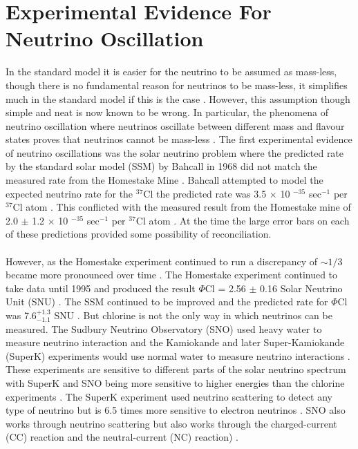 \section{Experimental Evidence For Neutrino Oscillation}\label{sec:neutrinoFlavours}
In the standard model it is easier for the neutrino to be assumed as mass-less, though there is no fundamental reason for neutrinos to be mass-less, it simplifies much in the standard model if this is the case \cite{griffiths2008neutrinoOscillations}. However, this assumption though simple and neat is now known to be wrong. In particular, the phenomena of neutrino oscillation where neutrinos oscillate between different mass and flavour states proves that neutrinos cannot be mass-less \cite{griffiths2008neutrinoOscillations}. The first experimental evidence of neutrino oscillations was the solar neutrino problem where the predicted rate by the standard solar model (SSM) by Bahcall in 1968 did not match the measured rate from the Homestake Mine \cite{griffiths2008neutrinoOscillations}. Bahcall attempted to model the expected neutrino rate for the $^{37}$Cl the predicted rate was 3.5 $\times$ 10 $^{-35}$ sec$^{-1}$ per $^{37}$Cl atom \cite{bahcall1968present}. This conflicted with the measured result from the Homestake mine of 2.0 $\pm$ 1.2 $\times$ 10 $^{-35}$ sec$^{-1}$ per $^{37}$Cl atom \cite{davis1968homestake}. At the time the large error bars on each of these predictions provided some possibility of reconciliation. 
\\\\However, as the Homestake experiment continued to run a discrepancy of $\sim 1/3$ became more pronounced over time \cite{griffiths2008neutrinoOscillations}. The Homestake experiment continued to take data until 1995 and produced the result $\Phi$Cl = 2.56 $\pm$ 0.16 Solar Neutrino Unit (SNU) \cite{Bellerive:2003rj}. The SSM continued to be improved and the predicted rate for $\Phi$Cl was 7.6$^{+ 1.3}_{-1.1}$ SNU \cite{Bellerive:2003rj}. But chlorine is not the only way in which neutrinos can be measured. The Sudbury Neutrino Observatory (SNO) used heavy water to measure neutrino interaction and the Kamiokande and later Super-Kamiokande (SuperK) experiments would use normal water to measure neutrino interactions \cite{Bellerive:2003rj}. These experiments are sensitive to different parts of the solar neutrino spectrum with SuperK and SNO being more sensitive to higher energies than the chlorine experiments \cite{Bellerive:2003rj}. The SuperK experiment used neutrino scattering to detect any type of neutrino but is 6.5 times more sensitive to electron neutrinos \cite{griffiths2008neutrinoOscillations}. SNO also works through neutrino scattering but also works through the charged-current (CC) reaction and  the neutral-current (NC) reaction) \cite{sno2001}\cite{Bellerive:2003rj} \cite{griffiths2008neutrinoOscillations}. 
